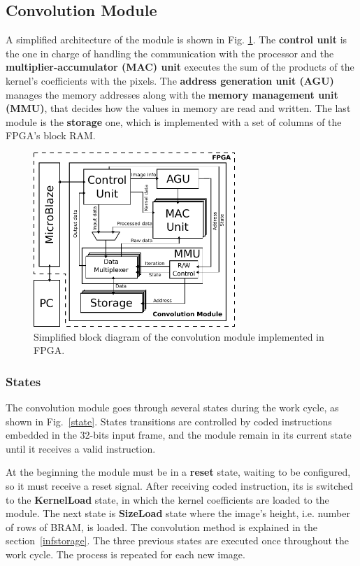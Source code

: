 \documentclass[conference,compsoc]{IEEEtran}
\begin{document}

\subsection{Convolution Module}
A simplified architecture of the module is shown in Fig. \ref{general}. The
\textbf{control unit} is the one in charge of handling the communication with
the processor and the \textbf{multiplier-accumulator (MAC) unit} executes the sum
of the products of the kernel's coefficients with the pixels. The
\textbf{address generation unit (AGU)} manages the memory addresses along with
the \textbf{memory management unit (MMU)}, that decides how the values in memory
are read and written. The last module is the \textbf{storage} one, which is
implemented with a set of columns of the FPGA's block RAM. 


\begin{figure}[!t]
\centering
\includegraphics[width=3in]{general.pdf}
\caption{Simplified block diagram of the convolution module implemented in FPGA.}
\label{general}
\end{figure}

\subsubsection{States}
The convolution module goes through several states during the work cycle, as
shown in Fig.~\ref{state}. States transitions are controlled by coded
instructions embedded in the 32-bits input frame, and the module remain in
its current state until it receives a valid instruction.

At the beginning the module must be in a \textbf{reset} state, waiting to be
configured, so it must receive a reset signal. After receiving coded
instruction, its is switched to the \textbf{KernelLoad} state, in which the
kernel coefficients are loaded to the module. The next state is
\textbf{SizeLoad} state where the image's height, i.e.  number of rows of BRAM, is
loaded. The convolution method is explained in the section~\ref{infstorage}. The
three previous states are executed once throughout the work cycle. The process
is repeated for each new image.
\end{document}
